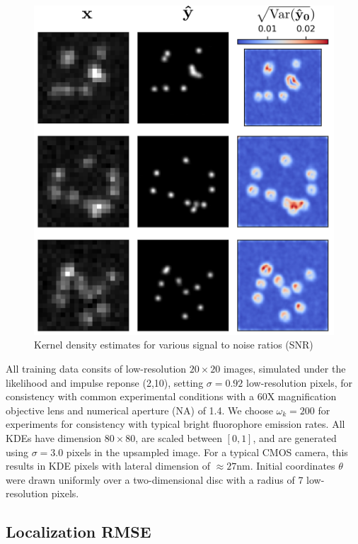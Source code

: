 \documentclass{article}
\begin{document}
\begin{figure}
\centering
\includegraphics[scale=0.8]{Samples.png}
\caption{Kernel density estimates for various signal to noise ratios (SNR)}
\end{figure}

All training data consits of low-resolution $20\times 20$ images, simulated under the likelihood and impulse reponse (2,10), setting $\sigma=0.92$ low-resolution pixels, for consistency with common experimental conditions with a 60X magnification objective lens and numerical aperture (NA) of 1.4. We choose $\omega_{k}=200$ for experiments for consistency with typical bright fluorophore emission rates. All KDEs have dimension $80\times 80$, are scaled between $[0,1]$, and are generated using $\sigma=3.0$ pixels in the upsampled image. For a typical CMOS camera, this results in KDE pixels with lateral dimension of $\approx 27\mathrm{nm}$. Initial coordinates $\theta$ were drawn uniformly over a two-dimensional disc with a radius of 7 low-resolution pixels.

\subsection{Localization RMSE}
\end{document}
